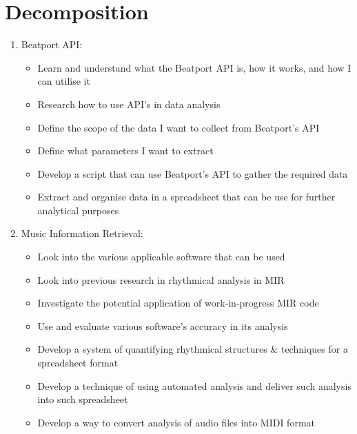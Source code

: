 \documentclass{article}
\begin{document}
\section{Decomposition}
\begin{enumerate}
    \item Beatport API:
    \begin{itemize}
        \item Learn and understand what the Beatport API is, how it works, and how I can utilise it
        \item Research how to use API's in data analysis
        \item Define the scope of the data I want to collect from Beatport's API
        \item Define what parameters I want to extract
        \item Develop a script that can use Beatport's API to gather the required data
        \item Extract and organise data in a spreadsheet that can be use for further analytical purposes
    \end{itemize}
    \item Music Information Retrieval:
    \begin{itemize}
        \item Look into the various applicable software that can be used
        \item Look into previous research in rhythmical analysis in MIR
        \item Investigate the potential application of work-in-progress MIR code
        \item Use and evaluate various software's accuracy in its analysis
        \item Develop a system of quantifying rhythmical structures \& techniques for a spreadsheet format
        \item Develop a technique of using automated analysis and deliver such analysis into such spreadsheet
        \item Develop a way to convert analysis of audio files into MIDI format
    \end{itemize}
\end{enumerate}
\end{document}
